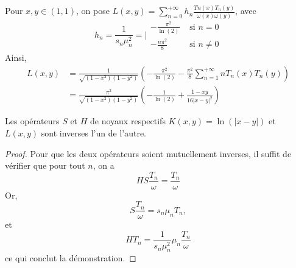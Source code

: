 \documentclass[11pt,a4paper]{article}
\begin{document}
	Pour $x,y \in (1,1)$, on pose $L(x,y) = \sum_{n=0}^{+\infty} h_n \frac{Tn(x) T_n(y)}{\omega(x)\omega(y)}$, avec 
	\[h_n = \frac{1}{s_n \mu_n^2} = \Bigg|\begin{array}{lr}
	-\frac{\pi^2}{\ln(2)} & \text{ si } n = 0\\
	-\frac{n\pi^2}{8} & \text{ si } n \neq 0
	\end{array}\]
	Ainsi, 
	\begin{align}
		L(x,y) &= \frac{1}{\sqrt{(1-x^2)(1-y^2)}} \left(-\frac{\pi^2}{\ln(2)} - \frac{\pi^2}{8} \sum_{n=1}^{+\infty} n T_n(x)T_n(y)\right) \\
		&= \frac{\pi^2}{\sqrt{(1-x^2)(1-y^2)}} \left(-\frac{1}{\ln(2)} + \frac{1-xy}{16|x-y|^2}\right)
	\end{align}
	
	\begin{Cor*} 
		Les opérateurs $S$ et $H$ de noyaux respectifs $K(x,y) = \ln(|x-y|)$ et $L(x,y)$ sont inverses l'un de l'autre. 
		\begin{proof}
			Pour que les deux opérateurs soient mutuellement inverses, il suffit de vérifier que pour tout $n$, on a
			\begin{equation}
				HS \frac{T_n}{\omega} = \frac{T_n}{\omega}
			\end{equation}
			Or, 
			\[S\frac{T_n}{\omega} = s_n \mu_n T_n,\]			
			et 
			\[HT_n = \frac{1}{s_n \mu_n^2} \mu_n \frac{T_n}{\omega} \]
			ce qui conclut la démonstration.
		\end{proof}
	\end{Cor*}
\end{document}
